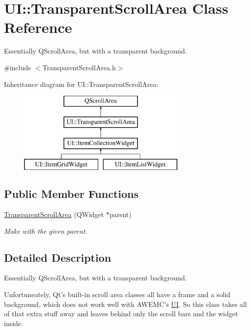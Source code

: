 \hypertarget{class_u_i_1_1_transparent_scroll_area}{\section{U\-I\-:\-:Transparent\-Scroll\-Area Class Reference}
\label{class_u_i_1_1_transparent_scroll_area}
}


Essentially {\ttfamily Q\-Scroll\-Area}, but with a transparent background.  




{\ttfamily \#include $<$Transparent\-Scroll\-Area.\-h$>$}

Inheritance diagram for U\-I\-:\-:Transparent\-Scroll\-Area\-:\begin{figure}[H]
\begin{center}
\leavevmode
\includegraphics[height=4.000000cm]{class_u_i_1_1_transparent_scroll_area}
\end{center}
\end{figure}
\subsection*{Public Member Functions}
\begin{DoxyCompactItemize}
\item 
\hyperlink{class_u_i_1_1_transparent_scroll_area_a35ae8889a49ba4054c0bd8fa91a11db4}{Transparent\-Scroll\-Area} (Q\-Widget $\ast$parent)
\begin{DoxyCompactList}\small\item\em Make with the given parent. \end{DoxyCompactList}\end{DoxyCompactItemize}


\subsection{Detailed Description}
Essentially {\ttfamily Q\-Scroll\-Area}, but with a transparent background. 

Unfortuneately, Qt's built-\/in scroll area classes all have a frame and a solid background, which does not work well with A\-W\-E\-M\-C's \hyperlink{namespace_u_i}{U\-I}. So this class takes all of that extra stuff away and leaves behind only the scroll bars and the widget inside.

